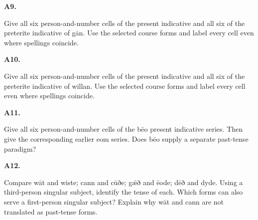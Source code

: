 \par\begin{minipage}{\linewidth}\raggedright
\textbf{A9.}

Give all six person-and-number cells of the present indicative and all six of the preterite indicative of gān. Use the selected course forms and label every cell even where spellings coincide.

\end{minipage}\par\addvspace{4pt}

\par\begin{minipage}{\linewidth}\raggedright
\textbf{A10.}

Give all six person-and-number cells of the present indicative and all six of the preterite indicative of willan. Use the selected course forms and label every cell even where spellings coincide.

\end{minipage}\par\addvspace{4pt}

\par\begin{minipage}{\linewidth}\raggedright
\textbf{A11.}

Give all six person-and-number cells of the bēo present indicative series. Then give the corresponding earlier eom series. Does bēo supply a separate past-tense paradigm?

\end{minipage}\par\addvspace{4pt}

\par\begin{minipage}{\linewidth}\raggedright
\textbf{A12.}

Compare wāt and wiste; cann and cūðe; gǣð and ēode; dēð and dyde. Using a third-person singular subject, identify the tense of each. Which forms can also serve a first-person singular subject? Explain why wāt and cann are not translated as past-tense forms.

\end{minipage}\par\addvspace{4pt}


